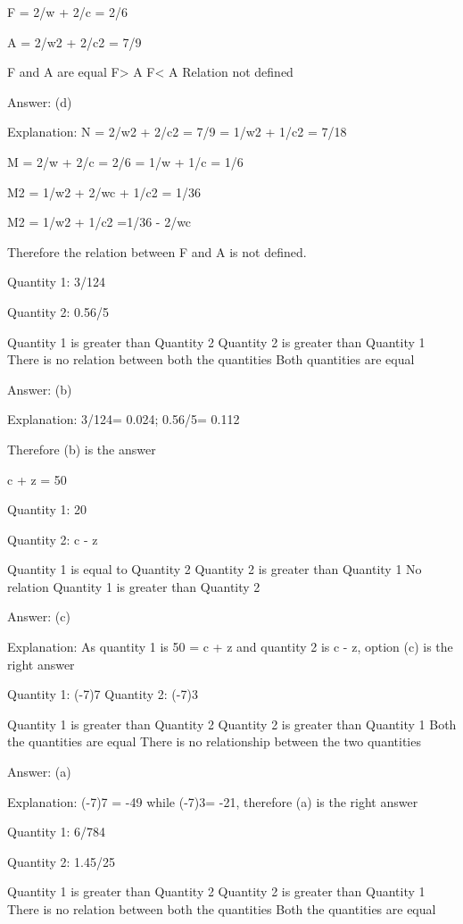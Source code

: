     F = 2/w + 2/c = 2/6

    A = 2/w2 + 2/c2 = 7/9

        F and A are equal
        F> A
        F< A
        Relation not defined

    Answer: (d)

    Explanation: N = 2/w2 + 2/c2 = 7/9 = 1/w2 + 1/c2 = 7/18

    M = 2/w + 2/c = 2/6 = 1/w + 1/c = 1/6

    M2 = 1/w2 + 2/wc + 1/c2 = 1/36

    M2 = 1/w2 + 1/c2 =1/36 - 2/wc

    Therefore the relation between F and A is not defined.

    Quantity 1: 3/124

    Quantity 2: 0.56/5

        Quantity 1 is greater than Quantity 2
        Quantity 2 is greater than Quantity 1
        There is no relation between both the quantities
        Both quantities are equal

    Answer: (b)

    Explanation: 3/124= 0.024; 0.56/5= 0.112

    Therefore (b) is the answer

    c + z = 50

    Quantity 1: 20

    Quantity 2: c - z

        Quantity 1 is equal to Quantity 2
        Quantity 2 is greater than Quantity 1
        No relation
        Quantity 1 is greater than Quantity 2

    Answer: (c)

    Explanation: As quantity 1 is 50 = c + z and quantity 2 is c - z, option (c) is the right answer

    Quantity 1: (-7)7
    Quantity 2: (-7)3

        Quantity 1 is greater than Quantity 2
        Quantity 2 is greater than Quantity 1
        Both the quantities are equal
        There is no relationship between the two quantities

    Answer: (a)

    Explanation: (-7)7 = -49 while (-7)3= -21, therefore (a) is the right answer

    Quantity 1: 6/784

    Quantity 2: 1.45/25

        Quantity 1 is greater than Quantity 2
        Quantity 2 is greater than Quantity 1
        There is no relation between both the quantities
        Both the quantities are equal


